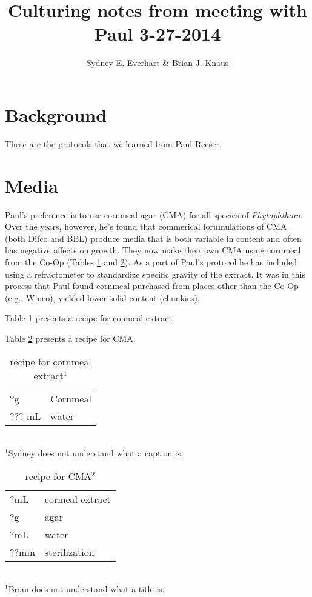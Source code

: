 \documentclass{article}\usepackage[]{graphicx}\usepackage[]{color}
\title{Culturing notes from meeting with Paul 3-27-2014}
\author{Sydney E. Everhart \& Brian J. Knaus}
\begin{document}
\maketitle
\tableofcontents

\listoftables

\newpage

\linenumbers

\section{Background}
These are the protocols that we learned from Paul Reeser.

\section{Media}
Paul's preference is to use cornmeal agar (CMA) for all species of \emph{Phytophthora}. Over the years, however, he's found that commerical forumulations of CMA (both Difco and BBL) produce media that is both variable in content and often has negative affects on growth.  They now make their own CMA using cornmeal from the Co-Op (Tables \ref{tab:ext} and \ref{tab:cma}).  As a part of Paul's protocol he has included using a refractometer to standardize specific gravity of the extract.  It was in this process that Paul found cornmeal purchased from places other than the Co-Op (e.g., Winco), yielded lower solid content (chunkies).  

Table \ref{tab:ext} presents a recipe for conmeal extract.

Table \ref{tab:cma} presents a recipe for CMA.

\begin{table}[h]
\centering
\caption{recipe for cornmeal extract$^{1}$}
\begin{tabular}{ll}
\hline
 ?g & Cornmeal \\
 ??? mL & water \\
 \hline
\end{tabular}
\label{tab:ext}
\\
$^{1}$Sydney does not understand what a caption is.
\end{table}

\begin{table}[h]
\centering
\caption{recipe for CMA$^{2}$}
\begin{tabular}{ll}
\hline
?mL & cormeal extract\\
?g & agar\\
?mL & water\\
??min & sterilization \\
\hline
\end{tabular}
\label{tab:cma}
\\
$^{1}$Brian does not understand what a title is.
\end{table}
\end{document}

